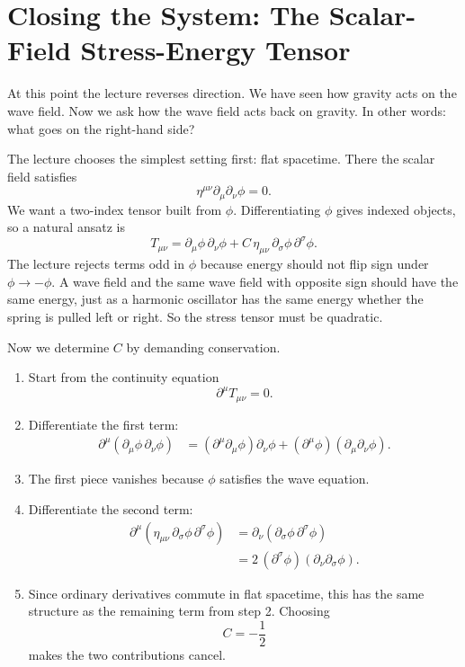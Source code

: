 \section{Closing the System: The Scalar-Field Stress-Energy Tensor}

At this point the lecture reverses direction. We have seen how gravity acts on the wave field. Now we ask how the wave field acts back on gravity. In other words: what goes on the right-hand side?

The lecture chooses the simplest setting first: flat spacetime. There the scalar field satisfies
\begin{equation}
\eta^{\mu\nu}\partial_\mu\partial_\nu\phi=0.
\end{equation}
We want a two-index tensor built from \(\phi\). Differentiating \(\phi\) gives indexed objects, so a natural ansatz is
\begin{equation}
T_{\mu\nu}
=
\partial_\mu\phi\,\partial_\nu\phi
+
C\,\eta_{\mu\nu}\,\partial_\sigma\phi\,\partial^\sigma\phi.
\end{equation}
The lecture rejects terms odd in \(\phi\) because energy should not flip sign under \(\phi\to -\phi\). A wave field and the same wave field with opposite sign should have the same energy, just as a harmonic oscillator has the same energy whether the spring is pulled left or right. So the stress tensor must be quadratic.

Now we determine \(C\) by demanding conservation.

\begin{enumerate}
\item Start from the continuity equation
\begin{equation}
\partial^\mu T_{\mu\nu}=0.
\end{equation}

\item Differentiate the first term:
\begin{align}
\partial^\mu\!\left(\partial_\mu\phi\,\partial_\nu\phi\right)
&=
(\partial^\mu\partial_\mu\phi)\partial_\nu\phi
+
(\partial^\mu\phi)(\partial_\mu\partial_\nu\phi).
\end{align}

\item The first piece vanishes because \(\phi\) satisfies the wave equation.

\item Differentiate the second term:
\begin{align}
\partial^\mu\!\left(\eta_{\mu\nu}\,\partial_\sigma\phi\,\partial^\sigma\phi\right)
&=
\partial_\nu\!\left(\partial_\sigma\phi\,\partial^\sigma\phi\right) \\
&=
2\,(\partial^\sigma\phi)(\partial_\nu\partial_\sigma\phi).
\end{align}

\item Since ordinary derivatives commute in flat spacetime, this has the same structure as the remaining term from step 2. Choosing
\begin{equation}
C=-\frac12
\end{equation}
makes the two contributions cancel.
\end{enumerate}

